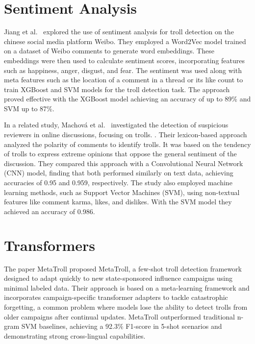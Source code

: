 \documentclass[twoside]{ctuthesis}
\theoremstyle{plain}
\theoremstyle{definition}
\theoremstyle{note}
\begin{document}
\section{Sentiment Analysis}
Jiang et al.~\cite{Jiang2021Sentiment} explored the use of sentiment analysis for troll detection on the chinese social media platform Weibo.  They employed a Word2Vec model trained on a dataset of Weibo comments to generate word embeddings. These embeddings were then used to calculate sentiment scores, incorporating features such as happiness, anger, disgust, and fear. The sentiment was used along with meta features such as the location of a comment in a thread or its like count to train XGBoost and SVM models for the troll detection task. The approach proved effective with the XGBoost model achieving an accuracy of up to 89\% and SVM up to 87\%.\par
In a related study, Machová et al.~\cite{Machova2022Comparison} investigated the detection of suspicious reviewers in online discussions, focusing on trolls. . Their lexicon-based approach analyzed the polarity of comments to identify trolls. It was based on the tendency of trolls to express extreme opinions that oppose the general sentiment of the discussion. They compared this approach with a Convolutional Neural Network (CNN) model, finding that both performed similarly on text data, achieving accuracies of 0.95 and 0.959, respectively.  The study also employed machine learning methods, such as Support Vector Machines (SVM), using non-textual features like comment karma, likes, and dislikes. With the SVM model they achieved an accuracy of 0.986.

\section{Transformers}
The paper MetaTroll proposed MetaTroll, a few-shot troll detection framework designed to adapt quickly to new state-sponsored influence campaigns using minimal labeled data. Their approach is based on a meta-learning framework and incorporates campaign-specific transformer adapters to tackle catastrophic forgetting, a common problem where models lose the ability to detect trolls from older campaigns after continual updates. MetaTroll outperformed traditional n-gram SVM baselines, achieving a 92.3\% F1-score in 5-shot scenarios and demonstrating strong cross-lingual capabilities. 

\end{document}
